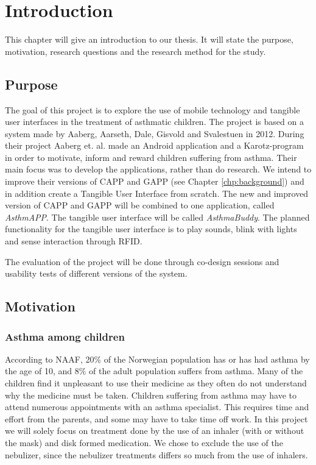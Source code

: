 \chapter{Introduction}
\label{chp:introduction}

This chapter will give an introduction to our thesis. It will state the purpose, motivation, research questions and the research method for the study. 

\section{Purpose}
\label{sec:purpose}

The goal of this project is to explore the use of mobile technology and tangible user interfaces in the treatment of asthmatic children. The project is based on a system made by Aaberg, Aarseth, Dale, Gisvold and Svalestuen in 2012\cite{CustomerDriven}. During their project Aaberg et. al. made an Android application and a Karotz-program in order to motivate, inform and reward children suffering from asthma. Their main focus was to develop the applications, rather than do research.
We intend to improve their versions of CAPP and GAPP (see Chapter \ref{chp:background}) and in addition create a Tangible User Interface from scratch. The new and improved version of CAPP and GAPP will be combined to one application, called \emph{AsthmAPP}. The tangible user interface will be called \emph{AsthmaBuddy}. The planned functionality for the tangible user interface is to play sounds, blink with lights and sense interaction through RFID. 

The evaluation of the project will be done through co-design sessions and usability tests of different versions of the system. 
 

\section{Motivation}
\label{sec:motivation}
\subsection{Asthma among children}
According to NAAF, 20\% of the Norwegian population has or has had asthma by the age of 10, and 8\% of the adult population suffers from asthma\cite{NAAF}. Many of the children find it unpleasant to use their medicine as they often do not understand why the medicine must be taken. Children suffering from asthma may have to attend numerous appointments with an asthma specialist. This requires time and effort from the parents, and some may have to take time off work. In this project we will solely focus on treatment done by the use of an inhaler (with or without the mask) and disk formed medication. We chose to exclude the use of the nebulizer, since the nebulizer treatments differs so much from the use of inhalers.

